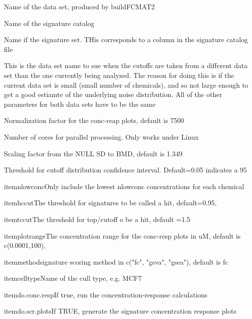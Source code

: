 \documentclass[letterpaper]{book}
\begin{document}
\begin{Arguments}
\begin{ldescription}
\item[\code{dataset}] Name of the data set, produced by buildFCMAT2

\item[\code{sigcatalog}] Name of the signature catalog

\item[\code{sigset}] Name if the signature set. THis corresponds to a column in the signature catalog file

\item[\code{cutoff.dataset}] This is the data set name to sue when the cutoffs are taken from a different data set than
the one currently being analyzed. The reason for doing this is if the current data set is small
(small number of chemicals), and so not large enough to get a good estiamte of the underlying
noise distribution. All of the other parameters for both data sets have to be the same

\item[\code{normfactor}] Normalization factor for the conc-reap plots, default is 7500

\item[\code{mc.cores}] Number of cores for parallel processing. Only works under Linux

\item[\code{bmr\_scale}] Scaling factor from the NULL SD to BMD, default is 1.349

\item[\code{pval}] Threshold for cutoff distribution confidence interval. Default=0.05 indicates a 95

\bsl{}itemnlowconcOnly include the lowest nlowconc concentrations for each chemical

\bsl{}itemhccutThe threshold for signatures to be called a hit, default=0.95,

\bsl{}itemtccutThe threshold for top/cutoff o be a hit, default =1.5

\bsl{}itemplotrangeThe concentration range for the conc-resp plots in uM, default is c(0.0001,100),

\bsl{}itemmethodsignature scoring method in c("fc", "gsva", "gsea"), default is fc

\bsl{}itemcelltypeName of the cull type, e.g. MCF7

\bsl{}itemdo.conc.respIf true, run the concentration-response calculations

\bsl{}itemdo.scr.plotsIf TRUE, generate the signature concentration response plots


\end{ldescription}
\end{Arguments}
\end{document}
